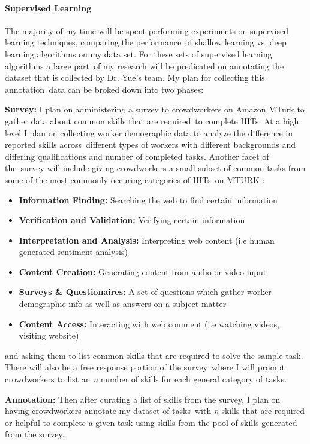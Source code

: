 \documentclass[letterpaper,12pt]{article}
\begin{document}
\paragraph{Supervised Learning}
The majority of my time will be spent performing experiments on supervised learning techniques, comparing the performance\
of shallow learning vs. deep learning algorithms on my data set. For these sets of supervised learning algorithms a large part\
of my research will be predicated on annotating the dataset that is collected by Dr. Yue's team. My plan for collecting this annotation\
data can be broked down into two phases:


\textbf{Survey:} I plan on administering a survey to crowdworkers on Amazon MTurk to gather data about common skills that are required\
to complete HITs. At a high level I plan on collecting worker demographic data to analyze the difference in reported skills across\
different types of workers with different backgrounds and differing qualifications and number of completed tasks. Another facet of the\
survey will include giving crowdworkers a small subset of common tasks from some of the most commonly occuring categories of HITs\
on MTURK \cite{difallah2015dynamics}:
\begin{itemize}
	\item \textbf{Information Finding:} Searching the web to find certain information
	\item \textbf{Verification and Validation:} Verifying certain information
	\item \textbf{Interpretation and Analysis:} Interpreting web content (i.e human generated sentiment analysis)
	\item \textbf{Content Creation: } Generating content from audio or video input
	\item \textbf{Surveys \& Questionaires:} A set of questions which gather worker demographic info as well as answers on a subject matter
	\item \textbf{Content Access:} Interacting with web comment (i.e watching videos, visiting website)
\end{itemize}

and asking them to list common skills that are required to solve the sample task. There will also be a free response portion of the survey\
where I will prompt crowdworkers to list an \emph{n} number of skills for each general category of tasks.

\textbf{Annotation:} Then after curating a list of skills from the survey, I plan on having crowdworkers annotate my dataset of tasks\
with \emph{n} skills that are required or helpful to complete a given task using skills from the pool of skills generated from the survey.
\end{document}
